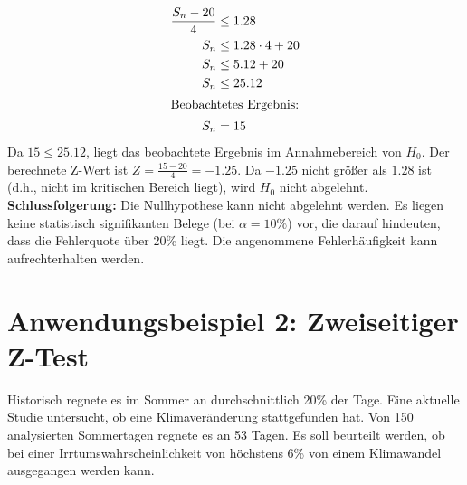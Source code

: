 \begin{align*}
    \frac{S_n - 20}{4} & \leq 1.28                                                                                     \\
    S_n                & \leq 1.28 \cdot 4 + 20                                                                        \\
    S_n                & \leq 5.12 + 20                                                                                \\
    S_n                & \leq 25.12                                                                                    \\
    \intertext{Beobachtetes Ergebnis:}
    S_n                & = 15                                                                                          \\
\end{align*}
Da $15 \leq 25.12$, liegt das beobachtete Ergebnis im Annahmebereich von $H_0$. Der berechnete Z-Wert ist $Z = \frac{15 - 20}{4} = -1.25$. Da $-1.25$ nicht größer als $1.28$ ist (d.h., nicht im kritischen Bereich liegt), wird $H_0$ nicht abgelehnt.
\textbf{Schlussfolgerung:} Die Nullhypothese kann nicht abgelehnt werden. Es liegen keine statistisch signifikanten Belege (bei $\alpha=10\%$) vor, die darauf hindeuten, dass die Fehlerquote über 20\% liegt. Die angenommene Fehlerhäufigkeit kann aufrechterhalten werden.

\section{Anwendungsbeispiel 2: Zweiseitiger Z-Test}

Historisch regnete es im Sommer an durchschnittlich 20\% der Tage. Eine
aktuelle Studie untersucht, ob eine Klimaveränderung stattgefunden hat. Von 150
analysierten Sommertagen regnete es an 53 Tagen. Es soll beurteilt werden, ob
bei einer Irrtumswahrscheinlichkeit von höchstens 6\% von einem Klimawandel
ausgegangen werden kann.

